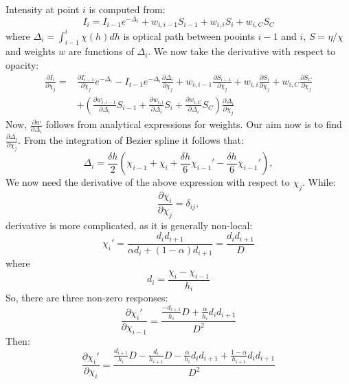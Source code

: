 \documentclass[a4paper,10pt]{article}
\begin{document}
Intensity at point $i$ is computed from:
\begin{equation}
 I_i = I_{i-1} e^{-\Delta_i} + w_{i,i-1} S_{i-1} + w_{i,i} S_i + w_{i,C} S_C
\end{equation}
where $\Delta_i = \int_{i-1}^{i} \chi(h) dh$ is optical path between pooints $i-1$ and $i$, $S=\eta/\chi$ and weights $w$ are functions of $\Delta_i$. We now take the derivative with respect to opacity: 
\begin{eqnarray}
 \frac{\partial I_i}{\partial \chi_j} = & \frac{\partial I_{i-1}}{\partial \chi_j} e^{-\Delta_i} - I_{i-1} e^{-\Delta_i} \frac{\partial \Delta_i}{\partial \chi_j} + w_{i,i-1} \frac{\partial S_{i-1}}{\partial \chi_j} + w_{i,i} \frac{\partial S_i}{\partial \chi_j} + w_{i,C} \frac{\partial S_C}{\partial \chi_j} \nonumber \\
 & + \left ( \frac{\partial w_{i,i-1}}{\partial \Delta_i} S_{i-1} + \frac{\partial w_{i,i}}{\partial \Delta_i} S_i + \frac{\partial w_{i,C}}{\partial \Delta_i} S_C \right ) \frac{\partial \Delta_i}{\partial \chi_j}
 \label{original}
 \end{eqnarray}
Now, $\frac{\partial w}{\partial \Delta_i}$ follows from analytical expressions for weights. Our aim now is to find $\frac{\partial \Delta_i}{\partial \chi_j}$. From the integration of Bezier spline it follows that: 
\begin{equation}
 \Delta_i = \frac{\delta h}{2} (\chi_{i-1} + \chi_i + \frac{\delta h}{6} \chi_{i-1}' - \frac{\delta h}{6} \chi_{i-1}'),
\end{equation}
We now need the derivative of the above expression with respect to $\chi_j$. While:
\begin{equation}
 \frac{\partial \chi_i}{\partial \chi_j} = \delta_{ij},
\end{equation}
derivative is more complicated, as it is generally non-local: 
\begin{equation}
  \chi_i' = \frac{d_i d_{i+1}}{\alpha d_i + (1-\alpha) d_{i+1}} = \frac{d_i d_{i+1}}{D}
\end{equation}
 where
\begin{equation}
 d_i = \frac{\chi_i - \chi_{i-1}}{h_i}
\end{equation}
So, there are three non-zero responses:
\begin{equation}
 \frac{\partial \chi_i'}{\partial \chi_{i-1}} = \frac{\frac{-d_{i+1}}{h_i}D + \frac{\alpha}{h_i}d_i d_{i+1}}{D^2}
\end{equation}
Then:
\begin{equation}
 \frac{\partial \chi_i'}{\partial \chi_i} = \frac{\frac{d_{i+1}}{h_i}D - \frac{d_{i}}{h_{i+1}}D - \frac{\alpha}{h_i}d_i d_{i+1} + \frac{1-\alpha}{h_{i+1}}d_i d_{i+1}}{D^2}
\end{equation}
\end{document}

